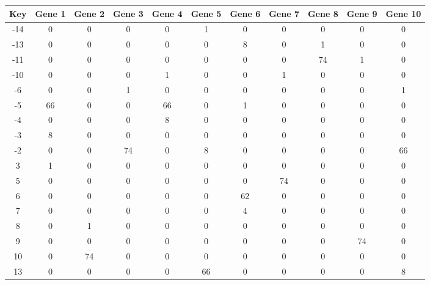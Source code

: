 \begin{tabular}{|c|c|c|c|c|c|c|c|c|c|c|}
\hline
Key & Gene 1 & Gene 2 & Gene 3 & Gene 4 & Gene 5 & Gene 6 & Gene 7 & Gene 8 & Gene 9 & Gene 10 \\
\hline
-14 & 0 & 0 & 0 & 0 & 1 & 0 & 0 & 0 & 0 & 0 \\
-13 & 0 & 0 & 0 & 0 & 0 & 8 & 0 & 1 & 0 & 0 \\
-11 & 0 & 0 & 0 & 0 & 0 & 0 & 0 & 74 & 1 & 0 \\
-10 & 0 & 0 & 0 & 1 & 0 & 0 & 1 & 0 & 0 & 0 \\
-6 & 0 & 0 & 1 & 0 & 0 & 0 & 0 & 0 & 0 & 1 \\
-5 & 66 & 0 & 0 & 66 & 0 & 1 & 0 & 0 & 0 & 0 \\
-4 & 0 & 0 & 0 & 8 & 0 & 0 & 0 & 0 & 0 & 0 \\
-3 & 8 & 0 & 0 & 0 & 0 & 0 & 0 & 0 & 0 & 0 \\
-2 & 0 & 0 & 74 & 0 & 8 & 0 & 0 & 0 & 0 & 66 \\
3 & 1 & 0 & 0 & 0 & 0 & 0 & 0 & 0 & 0 & 0 \\
5 & 0 & 0 & 0 & 0 & 0 & 0 & 74 & 0 & 0 & 0 \\
6 & 0 & 0 & 0 & 0 & 0 & 62 & 0 & 0 & 0 & 0 \\
7 & 0 & 0 & 0 & 0 & 0 & 4 & 0 & 0 & 0 & 0 \\
8 & 0 & 1 & 0 & 0 & 0 & 0 & 0 & 0 & 0 & 0 \\
9 & 0 & 0 & 0 & 0 & 0 & 0 & 0 & 0 & 74 & 0 \\
10 & 0 & 74 & 0 & 0 & 0 & 0 & 0 & 0 & 0 & 0 \\
13 & 0 & 0 & 0 & 0 & 66 & 0 & 0 & 0 & 0 & 8 \\
\hline
\end{tabular}